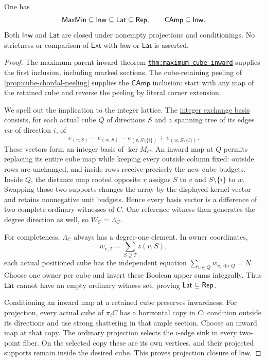 \begin{proposition}
\label{prop:atlas-witness-refinements}
One has
\[
 \mathsf{MaxMin}\subseteq\mathsf{Inw}\subseteq\mathsf{Lat}\subseteq\mathsf{Rep},
 \qquad \mathsf{CAmp}\subseteq\mathsf{Inw}.
\]
Both $\mathsf{Inw}$ and $\mathsf{Lat}$ are closed under nonempty
projections and conditionings. No strictness or comparison of
$\mathsf{Ext}$ with $\mathsf{Inw}$ or $\mathsf{Lat}$ is asserted.
\end{proposition}
\begin{proof}
The maximum-parent inward theorem
\href{../maxmin-forbidden/sections/cube_inward_representations.tex}
{\nolinkurl{thm:maximum-cube-inward}} supplies the first inclusion,
including marked sections. The cube-retaining peeling of
\cref{prop:cube-chordal-peeling} supplies the $\mathsf{CAmp}$ inclusion:
start with any map of the retained cube and reverse the peeling by
literal corner extension.

We spell out the implication to the integer lattice. The
\href{research/native_exchange_lattice.md}{integer exchange basis}
consists, for each actual cube $Q$ of directions $S$ and a spanning
tree of its edges $v w$ of direction $i$, of
\[
 e_{(v,S)}-e_{(w,S)}
 -e_{(v,S\setminus\{i\})}+e_{(w,S\setminus\{i\})}.
\]
These vectors form an integer basis of $\ker M_C$.
An inward map at $Q$ permits replacing its entire cube map while
keeping every outside column fixed: outside rows are unchanged,
and inside rows receive precisely the new cube budgets.
Inside $Q$, the distance map rooted opposite $v$ assigns $S$ to $v$
and $S\setminus\{i\}$ to $w$. Swapping those two supports changes the
array by the displayed kernel vector and retains nonnegative unit
budgets. Hence every basis vector is a difference of two complete
ordinary witnesses of $C$. One reference witness then generates the
degree direction as well, so $W_C=\Lambda_C$.

For completeness, $\Lambda_C$ always has a degree-one element.
In owner coordinates,
\[
 w_{v,T}=\sum_{S\supseteq T}z(v,S),
\]
each actual positioned cube has
the independent equation $\sum_{v\in Q}w_{v,\operatorname{dir}Q}=N$.
Choose one owner per cube and invert these Boolean upper sums
integrally. Thus $\mathsf{Lat}$ cannot have an empty ordinary witness
set, proving $\mathsf{Lat}\subseteq\mathsf{Rep}$.

Conditioning an inward map at a retained cube preserves inwardness.
For projection, every actual cube of $\pi_i C$ has a horizontal copy
in $C$: condition outside its directions and use strong shattering
in that ample section. Choose an inward map at that copy.
The ordinary projection selects the $i$-edge sink in every two-point
fiber. On the selected copy these are its own vertices, and their
projected supports remain inside the desired cube. This proves
projection closure of $\mathsf{Inw}$.


\end{proof}
